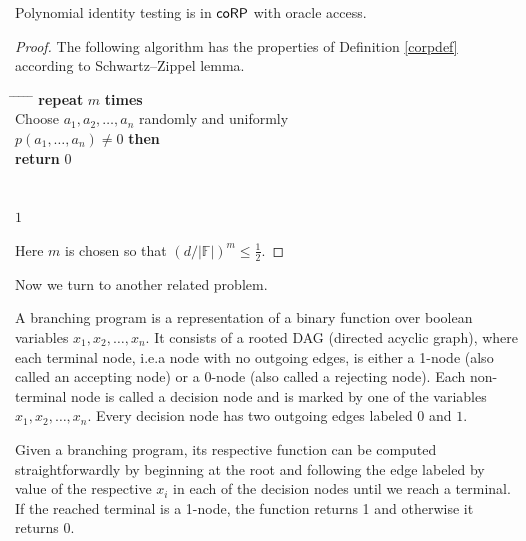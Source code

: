 \begin{proposition}
Polynomial identity testing is in $\mathsf{coRP}$ with oracle access.
\end{proposition}
\begin{proof}
The following algorithm has the properties of Definition \ref{corpdef} according to Schwartz--Zippel lemma.

\begin{tabbing}
\hspace*{.25in} \= \hspace*{.25in} \= \hspace*{.25in} \= \hspace*{.25in} \= \hspace*{.25in} \=\kill
\> {\bf repeat} $m$ {\bf times}\\
\>\> Choose $a_1, a_2, \ldots, a_n$ randomly and uniformly\\
\> $p(a_1, \ldots, a_n) \not = 0$ {\bf then } \\
\>\>\> {\bf return} $0$ \\
\>\\
 \\
 $1$
\end{tabbing}

Here $m$ is chosen so that $ \left( d / \vert \mathbb{F} \vert \right) ^ m \leq \frac{1}{2} $.
\end{proof}

Now we turn to another related problem.

\begin{definition}
A branching program is a representation of a binary function over boolean variables $x_1, x_2, \ldots, x_n$. It consists of a rooted DAG (directed acyclic graph), where each terminal node, i.e.\@ a node with no outgoing edges, is either a 1-node (also called an accepting node) or a 0-node (also called a rejecting node). Each non-terminal node is called a decision node and is marked by one of the variables $x_1, x_2, \ldots, x_n$. Every decision node has two outgoing edges labeled $0$ and $1$. 

Given a branching program, its respective function can be computed straightforwardly by beginning at the root and following the edge labeled by value of the respective $x_i$ in each of the decision nodes until we reach a terminal. If the reached terminal is a 1-node, the function returns 1 and otherwise it returns 0.
\end{definition}

